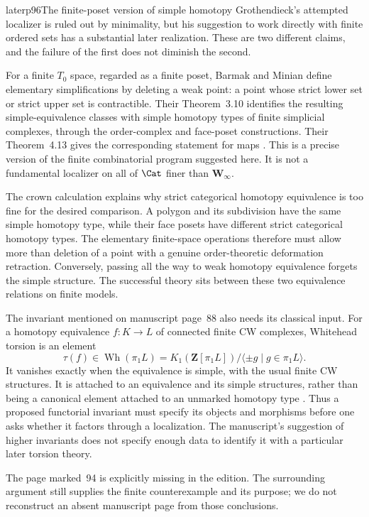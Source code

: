 \begin{dcomment}{later}{p96}{The finite-poset version of simple homotopy}
Grothendieck's attempted localizer is ruled out by minimality, but his suggestion to work directly with finite ordered sets has a substantial later realization. These are two different claims, and the failure of the first does not diminish the second.

For a finite $T_0$ space, regarded as a finite poset, Barmak and Minian define elementary simplifications by deleting a weak point: a point whose strict lower set or strict upper set is contractible. Their Theorem~3.10 identifies the resulting simple-equivalence classes with simple homotopy types of finite simplicial complexes, through the order-complex and face-poset constructions. Their Theorem~4.13 gives the corresponding statement for maps \citep{BarmakMinian2008}. This is a precise version of the finite combinatorial program suggested here. It is not a fundamental localizer on all of $\Cat$ finer than $\mathbf W_\infty$.

The crown calculation explains why strict categorical homotopy equivalence is too fine for the desired comparison. A polygon and its subdivision have the same simple homotopy type, while their face posets have different strict categorical homotopy types. The elementary finite-space operations therefore must allow more than deletion of a point with a genuine order-theoretic deformation retraction. Conversely, passing all the way to weak homotopy equivalence forgets the simple structure. The successful theory sits between these two equivalence relations on finite models.

The invariant mentioned on manuscript page~88 also needs its classical input. For a homotopy equivalence $f:K\to L$ of connected finite CW complexes, Whitehead torsion is an element
\[
 \tau(f)\in\operatorname{Wh}(\pi_1L)
 =K_1(\mathbf Z[\pi_1L])/\langle\pm g\mid g\in\pi_1L\rangle.
\]
It vanishes exactly when the equivalence is simple, with the usual finite CW structures. It is attached to an equivalence and its simple structures, rather than being a canonical element attached to an unmarked homotopy type \citep[Section~7]{Milnor1966Whitehead}. Thus a proposed functorial invariant must specify its objects and morphisms before one asks whether it factors through a localization. The manuscript's suggestion of higher invariants does not specify enough data to identify it with a particular later torsion theory.

The page marked~94 is explicitly missing in the edition. The surrounding argument still supplies the finite counterexample and its purpose; we do not reconstruct an absent manuscript page from those conclusions.
\end{dcomment}

